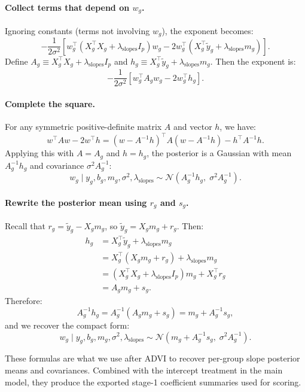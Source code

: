 \documentclass[11pt]{article}
\begin{document}
\paragraph{Collect terms that depend on $w_g$.}
Ignoring constants (terms not involving $w_g$), the exponent becomes:
\[
  -\frac{1}{2\sigma^2}\left[
    w_g^\top(X_g^\top X_g + \lambda_{\mathrm{slopes}} I_p)w_g
    - 2 w_g^\top(X_g^\top \tilde{y}_g + \lambda_{\mathrm{slopes}} m_g)
  \right].
\]
Define $A_g \equiv X_g^\top X_g + \lambda_{\mathrm{slopes}} I_p$ and $h_g \equiv X_g^\top \tilde{y}_g + \lambda_{\mathrm{slopes}} m_g$.
Then the exponent is:
\[
  -\frac{1}{2\sigma^2}\left[w_g^\top A_g w_g - 2 w_g^\top h_g\right].
\]

\paragraph{Complete the square.}
For any symmetric positive-definite matrix $A$ and vector $h$, we have:
\[
  w^\top A w - 2 w^\top h = (w - A^{-1}h)^\top A (w - A^{-1}h) - h^\top A^{-1}h.
\]
Applying this with $A=A_g$ and $h=h_g$, the posterior is a Gaussian with mean $A_g^{-1}h_g$ and covariance $\sigma^2 A_g^{-1}$:
\[
  w_g \mid y_g,b_g,m_g,\sigma^2,\lambda_{\mathrm{slopes}}
  \sim \mathcal{N}\!\left(A_g^{-1}h_g,\; \sigma^2 A_g^{-1}\right).
\]

\paragraph{Rewrite the posterior mean using $r_g$ and $s_g$.}
Recall that $r_g = \tilde{y}_g - X_g m_g$, so $\tilde{y}_g = X_g m_g + r_g$. Then:
\begin{align*}
  h_g
  &= X_g^\top \tilde{y}_g + \lambda_{\mathrm{slopes}} m_g \\
  &= X_g^\top (X_g m_g + r_g) + \lambda_{\mathrm{slopes}} m_g \\
  &= (X_g^\top X_g + \lambda_{\mathrm{slopes}} I_p)m_g + X_g^\top r_g \\
  &= A_g m_g + s_g.
\end{align*}
Therefore:
\[
  A_g^{-1}h_g = A_g^{-1}(A_g m_g + s_g) = m_g + A_g^{-1}s_g,
\]
and we recover the compact form:
\[
  w_g \mid y_g,b_g,m_g,\sigma^2,\lambda_{\mathrm{slopes}}
  \sim \mathcal{N}\!\left(m_g + A_g^{-1}s_g,\; \sigma^2 A_g^{-1}\right).
\]

These formulas are what we use after ADVI to recover per-group slope posterior means and covariances. Combined with the
intercept treatment in the main model, they produce the exported stage-1 coefficient summaries used for scoring.
\end{document}
